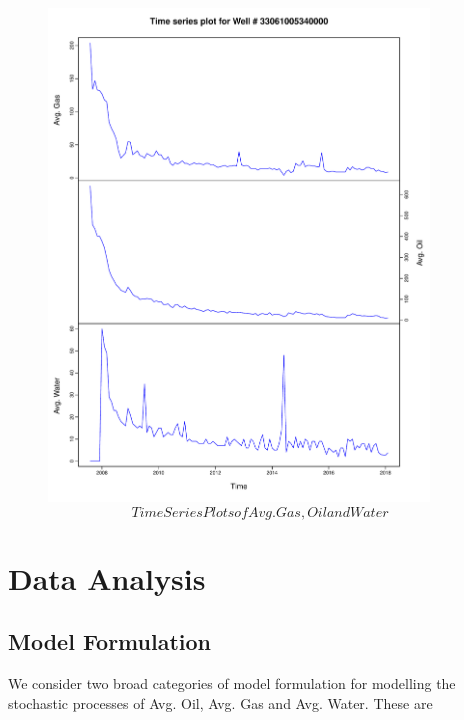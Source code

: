 \documentclass[a4paper]{article}
\begin{document}
 \begin{figure}
	\centering
	\includegraphics[width=0.9\textwidth]{TS}
	\caption{$$Time Series Plots of Avg. Gas , Oil and Water$$}
	\label{fig1:TS}
\end{figure}

\newpage

\section{Data Analysis}
\subsection{Model Formulation}

We consider two broad categories of model formulation for modelling the stochastic processes of Avg. Oil, Avg. Gas and Avg. Water. These are 
\end{document}
